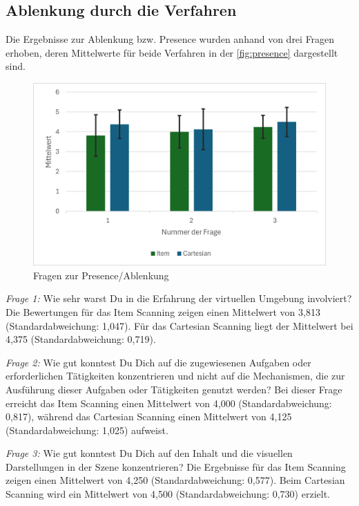 \subsection{Ablenkung durch die Verfahren}

Die Ergebnisse zur Ablenkung bzw. Presence wurden anhand von drei Fragen erhoben, deren Mittelwerte für beide Verfahren in der \autoref{fig:presence} dargestellt sind.

\begin{figure}[tbh]
    \centering
    \includegraphics{images/Results/Fragen-zur-Presence-Ablenkung.png}
    \caption{Fragen zur Presence/Ablenkung}
    \label{fig:presence}
\end{figure}

\textit{Frage 1:} Wie sehr warst Du in die Erfahrung der virtuellen Umgebung involviert?
Die Bewertungen für das Item Scanning zeigen einen Mittelwert von 3,813 (Standardabweichung: 1,047). Für das Cartesian Scanning liegt der Mittelwert bei 4,375 (Standardabweichung: 0,719).

\textit{Frage 2:} Wie gut konntest Du Dich auf die zugewiesenen Aufgaben oder erforderlichen Tätigkeiten konzentrieren und nicht auf die Mechanismen, die zur Ausführung dieser Aufgaben oder Tätigkeiten genutzt werden?
Bei dieser Frage erreicht das Item Scanning einen Mittelwert von 4,000 (Standardabweichung: 0,817), während das Cartesian Scanning einen Mittelwert von 4,125 (Standardabweichung: 1,025) aufweist.

\textit{Frage 3:} Wie gut konntest Du Dich auf den Inhalt und die visuellen Darstellungen in der Szene konzentrieren?
Die Ergebnisse für das Item Scanning zeigen einen Mittelwert von 4,250 (Standardabweichung: 0,577). Beim Cartesian Scanning wird ein Mittelwert von 4,500 (Standardabweichung: 0,730) erzielt.

